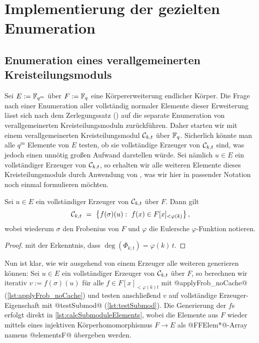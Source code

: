 \section{Implementierung der gezielten Enumeration}

\subsection{Enumeration eines verallgemeinerten Kreisteilungsmoduls}

Sei $E := \mathbb{F}_{q^m}$ über $F := \mathbb{F}_q$ eine Körpererweiterung endlicher Körper. Die Frage
nach einer Enumeration aller vollständig normaler Elemente dieser Erweiterung
lässt sich nach dem Zerlegungssatz () auf die
separate Enumeration von verallgemeinerten Kreisteilungsmoduln zurückführen.
Daher starten wir mit einem verallgemeinerten Kreisteilungsmodul $\mathcal{C}_{k,t}$
über $\mathbb{F}_q$. Sicherlich könnte man alle $q^m$ Elemente von $E$ testen, ob sie
vollständige Erzeuger von $\mathcal{C}_{k,t}$ sind, was jedoch einen unnötig großen
Aufwand darstellen würde. Sei nämlich $u\in E$ ein vollständiger Erzeuger von
$\mathcal{C}_{k,t}$, so erhalten wir alle weiteren Elemente dieses Kreisteilungsmoduls
durch Anwendung von , was wir hier in passender
Notation noch einmal formulieren möchten.

\begin{lemma}
  \label{lemma:moduln_durch_polys}
  Sei $u\in E$ ein vollständiger Erzeuger von $\mathcal{C}_{k,t}$ über $F$. 
  Dann gilt
  \[ \mathcal{C}_{k,t} \ =\  \big\{ f(\sigma)(u):\ f(x) \in F[x]_{<\varphi(k)}\big\} \,,\]
  wobei wiederum $\sigma$ den Frobenius von $F$ und 
  $\varphi$ die Eulersche $\varphi$-Funktion notieren.
\end{lemma}
\begin{proof}
   mit der Erkenntnis, dass
  $\deg(\Phi_{k,t}) = \varphi(k)\,t$.
\end{proof}

Nun ist klar, wie wir ausgehend von einem Erzeuger alle weiteren generieren
können: Sei $u \in E$ ein vollständiger Erzeuger von $\mathcal{C}_{k,t}$ über $F$, so 
berechnen wir iterativ $v := f(\sigma)(u)$ für alle $f \in F[x]_{<\varphi(k)t}$
mit @applyFrob_noCache@ (\autoref{lst:applyFrob_noCache}) 
und testen anschließend $v$ auf vollständige Erzeuger-Eigenschaft mit 
@testSubmod@ (\autoref{lst:testSubmod}). 
Die Generierung der $f$s erfolgt direkt in \autoref{lst:calcSubmoduleElements},
wobei die Elemente aus $F$ wieder mittels eines injektiven Körperhomomorphismus 
$F\to E$ als @FFElem*@-Array namens @elementsF@ übergeben werden.

